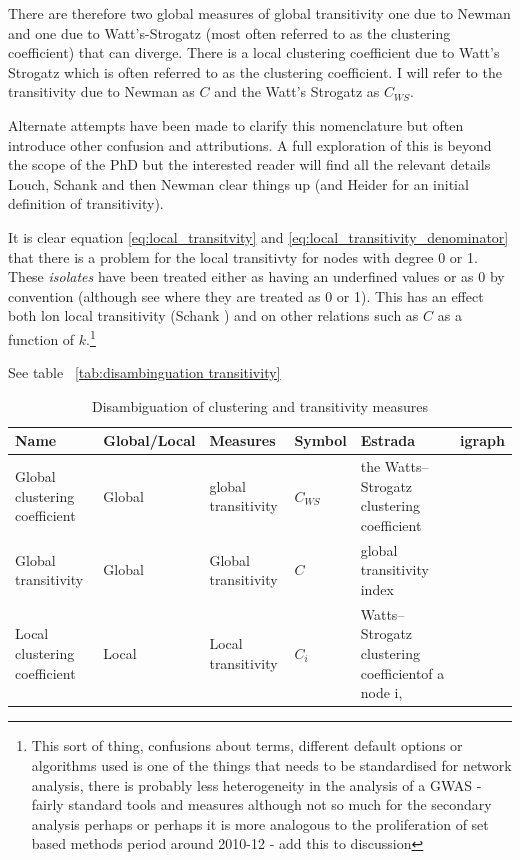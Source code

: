 There are therefore two global measures of global transitivity one due to Newman and one due to Watt's-Strogatz (most often referred to as the clustering coefficient) that can diverge. There is a local clustering coefficient due to Watt's Strogatz which is often referred to as the clustering coefficient. I will refer to the transitivity due to Newman as $C$ and the Watt's Strogatz as $C_{WS}$.

Alternate attempts have been made to clarify this nomenclature \cite{estrada2016local} but often introduce other confusion and attributions. A full exploration of this is beyond the scope of the PhD but the interested reader will find all the relevant details Louch\cite{louch2000personal}, Schank\cite{schank2005approximating} and then Newman \cite{newman2018networks} clear things up (and Heider\cite{heider1946attitudes} for an initial definition of transitivity). 
 
It is clear equation \ref{eq:local_transitvity} and \ref{eq:local_transitivity_denominator} that there is a problem for the local transitivty for nodes with degree 0 or 1. These \textit{isolates} have been treated either as having an underfined values or as 0 by convention (although see \cite{schank2005approximating} where they are treated as 0 or 1). This has an effect both lon local transitivity (Schank \cite{schank2005approximating}) and on other relations such as $C$ as a function of $k$.\footnote{This sort of thing, confusions about terms, different default options or algorithms used is one of the things that needs to be standardised for network analysis, there is probably less heterogeneity in the analysis of a GWAS - fairly standard tools and measures although not so much for the secondary analysis perhaps or perhaps it is more analogous to the proliferation of set based methods period around 2010-12 - add this to discussion}

See table ~\ref{tab:disambinguation transitivity}

\begin{table}[]
    \centering
    \begin{adjustbox}{width=\textwidth}
   
    \begin{tabular}{llllll}
       Name  & Global/Local & Measures & Symbol & Estrada & igraph  \\
       \toprule
        Global clustering coefficient & Global & global transitivity & $C_{WS}$ & {the Watts–Strogatz clustering coefficient} & \\
        \midrule
        Global transitivity & Global & Global transitivity & $C$ & global transitivity index & \\
        Local clustering coefficient & Local & Local transitivity & $C_i$ & Watts–Strogatz clustering coefficientof a node i,&\\
        \bottomrule
    \end{tabular}
     \end{adjustbox}
    \caption{Disambiguation of clustering and transitivity measures}
    \label{tab:disambiguation transitivity}
\end{table}



